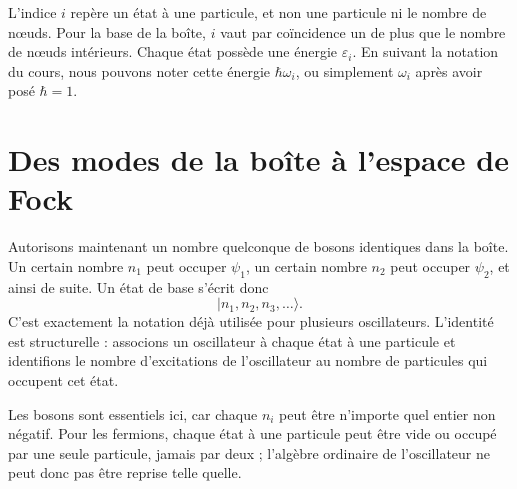 L’indice \(i\) repère un état à une particule, et non une particule ni le nombre de nœuds. Pour la base de la boîte, \(i\) vaut par coïncidence un de plus que le nombre de nœuds intérieurs. Chaque état possède une énergie \(\varepsilon_i\). En suivant la notation du cours, nous pouvons noter cette énergie \(\hbar\omega_i\), ou simplement \(\omega_i\) après avoir posé \(\hbar=1\).

\begin{classroomqa}\end{classroomqa}

\begin{classroomqa}\end{classroomqa}

\section{Des modes de la boîte à l’espace de Fock}

Autorisons maintenant un nombre quelconque de bosons identiques dans la boîte. Un certain nombre \(n_1\) peut occuper \(\psi_1\), un certain nombre \(n_2\) peut occuper \(\psi_2\), et ainsi de suite. Un état de base s’écrit donc
\begin{equation}
|n_1,n_2,n_3,\ldots\rangle.
\end{equation}
C’est exactement la notation déjà utilisée pour plusieurs oscillateurs. L’identité est structurelle : associons un oscillateur à chaque état à une particule et identifions le nombre d’excitations de l’oscillateur au nombre de particules qui occupent cet état.

Les bosons sont essentiels ici, car chaque \(n_i\) peut être n’importe quel entier non négatif. Pour les fermions, chaque état à une particule peut être vide ou occupé par une seule particule, jamais par deux ; l’algèbre ordinaire de l’oscillateur ne peut donc pas être reprise telle quelle.

